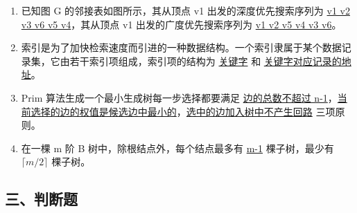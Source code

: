 \documentclass[12pt, a4paper]{article}
\begin{document}
\begin{enumerate}
    \item 已知图 G 的邻接表如图所示，其从顶点 v1 出发的深度优先搜索序列为 \underline{v1 v2 v3 v6 v5 v4}，其从顶点 v1 出发的广度优先搜索序列为 \underline{v1 v2 v5 v4 v3 v6}。
    \item 索引是为了加快检索速度而引进的一种数据结构。一个索引隶属于某个数据记录集，它由若干索引项组成，索引项的结构为 \underline{关键字} 和 \underline{关键字对应记录的地址}。
    \item Prim 算法生成一个最小生成树每一步选择都要满足 \underline{边的总数不超过 n-1}，\underline{当前选择的边的权值是候选边中最小的}，\underline{选中的边加入树中不产生回路} 三项原则。
    \item 在一棵 m 阶 B 树中，除根结点外，每个结点最多有 \underline{m-1} 棵子树，最少有 \underline{$\lceil m/2 \rceil$} 棵子树。
\end{enumerate}

\subsection*{三、判断题}
\end{document}
